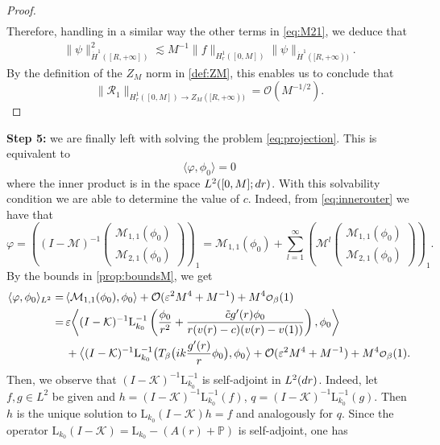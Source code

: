 \documentclass[11pt,reqno]{amsproc}
\def\dd{{\rm d}}
\def\eps{\varepsilon}
\newcommand{\rmL}{\mathrm{L}}
\newcommand{\cM}{\mathcal{M}}
\newcommand{\cK}{\mathcal{K}}
\newcommand{\cO}{\mathcal{O}}
\newcommand\smallO{
  \mathchoice
    {{\scriptstyle\mathcal{O}}}%
    {{\scriptstyle\mathcal{O}}}%
    {{\scriptscriptstyle\mathcal{O}}}%
    {\scalebox{.7}{$\scriptscriptstyle\mathcal{O}$}}%
  }
\theoremstyle{definition}
\theoremstyle{definition}
\numberwithin{equation}{section}
\begin{document}
\begin{proof}
\begin{align}
\end{align}
Therefore, handling in a similar way the other terms in \cref{eq:M21}, we deduce that 
\begin{align}
    \| \psi \|_{\dot{H}^1([R,+\infty])}^2 \lesssim M^{-1} \| f\|_{H^1_r([0,M])} \|\psi\|_{\dot{H}^1([R,+\infty))}.
\end{align}
By the definition of the $Z_M$ norm in \cref{def:ZM}, this enables us to conclude that
\begin{equation}
\|\mathcal R_1\|_{H^1_r([0,M]) \rightarrow Z_M([R,+\infty))} = \cO(M^{-1/2}).
\end{equation}
\end{proof}

\medskip 

\textbf{Step 5:} we are finally left with solving the problem \cref{eq:projection}. This is equivalent to  
\begin{equation}
    \langle \varphi, \phi_0 \rangle=0
\end{equation}
where the inner product is in the space $L^2([0,M];\dd r)$. With this solvability condition we are able to determine the value of $c$. Indeed, from \cref{eq:innerouter} we have that 
\begin{equation}
    \varphi=\left((I-\cM)^{-1}\begin{pmatrix}
        \cM_{1,1}(\phi_0)\\
        \cM_{2,1}(\phi_0)
    \end{pmatrix}\right)_1=\cM_{1,1}(\phi_0) +\sum_{l= 1}^\infty\left(\cM^l\begin{pmatrix}
        \cM_{1,1}(\phi_0)\\
        \cM_{2,1}(\phi_0)
    \end{pmatrix}\right)_1.
\end{equation}
By the bounds in \cref{prop:boundsM}, we get 
\begin{align}
\label{eq:zero_projection}
    \langle \varphi,\phi_0\rangle_{L^2}=\,&\langle \cM_{1,1}(\phi_0),\phi_0\rangle+\mathcal{O}(\eps^2 M^4+M^{-1})+ M^4\smallO_\beta(1)\\
    \notag =\,&\eps \bigg\langle(I-\cK)^{-1}\rmL_{k_0}^{-1}\left(\frac{\phi_0}{r^2}+\frac{\tilde{c}g'(r)\phi_0}{r(v(r)-c)(v(r)-v(1))}\right),\phi_0\bigg\rangle\\
    \notag &+\big\langle(I-\cK)^{-1}\rmL_{k_0}^{-1}\big(T_\beta\big(ik\frac{g'(r)}{r}\phi_0\big),\phi_0\big\rangle+\mathcal{O}(\eps^2 M^4+M^{-1})+ M^4\smallO_\beta(1).
\end{align}
Then, we observe that $(I-\cK)^{-1}\rmL_{k_0}^{-1}$ is self-adjoint in $L^2(\dd r)$. Indeed, let $f, g\in L^2$ be given and $h=(I-\cK)^{-1}\rmL_{k_0}^{-1}(f)$, $q=(I-\cK)^{-1}\rmL_{k_0}^{-1}(g)$. Then $h$ is the unique solution to $\rmL_{k_0}(I-\cK) h=f$ and analogously for $q$. Since the operator $\rmL_{k_0}(I-\cK)= \rmL_{k_0}-(A(r)+\mathbb{P})$ is self-adjoint, one has 
\end{document}
